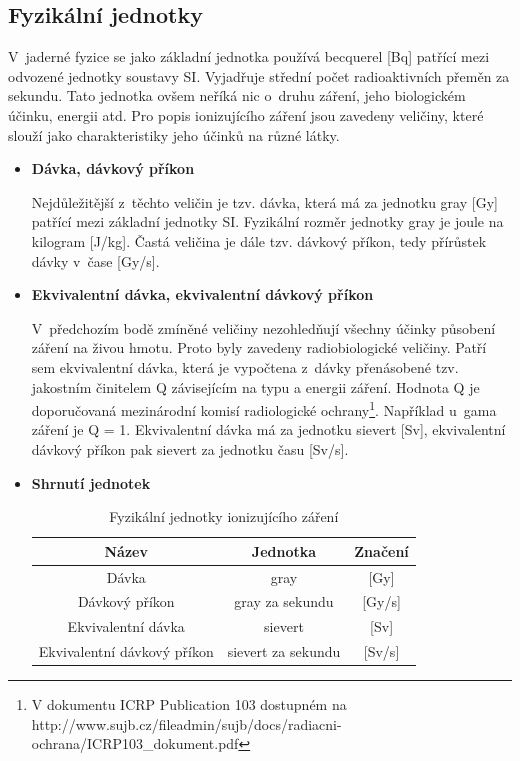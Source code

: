 \subsection{Fyzikální jednotky} 
V~jaderné fyzice se jako základní jednotka používá becquerel [Bq] patřící mezi odvozené jednotky soustavy SI. Vyjadřuje střední počet radioaktivních přeměn za sekundu. Tato jednotka ovšem neříká nic o~druhu záření, jeho biologickém účinku, energii atd. Pro popis ionizujícího záření jsou zavedeny veličiny, které slouží jako charakteristiky jeho účinků na různé látky. \cite{atomInfo}

\begin{itemize}
	\item \textbf{Dávka, dávkový příkon}
	
		 Nejdůležitější z~těchto veličin je tzv. dávka, která má za jednotku gray [Gy] patřící mezi základní jednotky SI. Fyzikální rozměr jednotky gray je joule na kilogram [J/kg]. Častá veličina je dále tzv. dávkový příkon, tedy přírůstek dávky v~čase [Gy/s]. 
		
	\item \textbf{Ekvivalentní dávka, ekvivalentní dávkový příkon}

	 	V~předchozím bodě zmíněné veličiny nezohledňují všechny účinky působení záření na živou hmotu. Proto byly zavedeny radiobiologické veličiny. Patří sem ekvivalentní dávka, která je vypočtena z~dávky přenásobené tzv. jakostním činitelem Q závisejícím na typu a energii záření. Hodnota Q je doporučovaná mezinárodní komisí radiologické ochrany\footnote{V dokumentu ICRP Publication 103 dostupném na http://www.sujb.cz/fileadmin/sujb/docs/radiacni-ochrana/ICRP103\_dokument.pdf}. Například u~gama záření je Q = 1. Ekvivalentní dávka má za jednotku sievert [Sv], ekvivalentní dávkový příkon pak sievert za jednotku času [Sv/s].
	 	
	\item \textbf{Shrnutí jednotek}
	
		\begin{table}[h!]
			\centering
			\caption{Fyzikální jednotky ionizujícího záření}
			\label{tab:tabulkaJednotek}
			\begin{tabular}{|c|c|c|}
				\hline
				\textbf{Název}              & \textbf{Jednotka}  & \textbf{Značení} \\ \hline
				Dávka                       & gray               & {[}Gy{]}         \\ \hline
				Dávkový příkon              & gray za sekundu    & {[}Gy/s{]}       \\ \hline
				Ekvivalentní dávka          & sievert            & {[}Sv{]}         \\ \hline
				Ekvivalentní dávkový příkon & sievert za sekundu & {[}Sv/s{]}       \\ \hline
			\end{tabular}
		\end{table}
\end{itemize}


